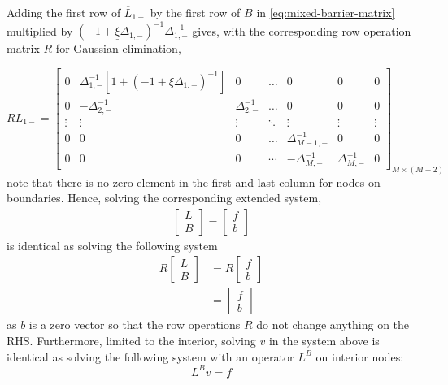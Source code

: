 \documentclass[11pt]{article}
\theoremstyle{definition}
\begin{document}
Adding the first row of $\overline{L}_{1-}$ by the first row of $B$ in \eqref{eq:mixed-barrier-matrix} multiplied by $(-1 + \underline{\xi} \Delta_{1,-} )^{-1}\Delta_{1,-}^{-1}$ gives, with the corresponding row operation matrix $R$ for Gaussian elimination,

\begin{equation}
R {L}_{1-} = \begin{bmatrix}
0&\Delta_{1,-}^{-1} \left[ 1 + (-1+\underline{\xi} \Delta_{1,-} )^{-1} \right] &0&\dots&0&0&0\\
0&-\Delta_{2,-}^{-1}&\Delta_{2,-}^{-1}&\dots&0&0&0\\
\vdots&\vdots&\vdots&\ddots&\vdots&\vdots&\vdots\\
0&0&0&\dots&\Delta_{M-1,-}^{-1}&0&0\\
0&0&0&\cdots&-\Delta_{M,-}^{-1}&\Delta_{M,-}^{-1}&0
\end{bmatrix}_{M\times (M+2)}
\end{equation}
note that there is no zero element in the first and last column for nodes on boundaries. Hence, solving the corresponding extended system,
\begin{align}
\begin{bmatrix}
{L}\\
B
\end{bmatrix} =
\begin{bmatrix}
f \\ b
\end{bmatrix}
\end{align}
is identical as solving the following system
\begin{align}
R
\begin{bmatrix}
{L}\\
B
\end{bmatrix} &=
R
\begin{bmatrix}
f \\ b
\end{bmatrix} \\
&= \begin{bmatrix}
f \\ b
\end{bmatrix}
\end{align}
as $b$ is a zero vector so that the row operations $R$ do not change anything on the RHS. Furthermore, limited to the interior, solving $v$ in the system above is identical as solving the following system with an operator $L^B$ on interior nodes:
\begin{equation}
L^B v = f
\end{equation}
\end{document}
